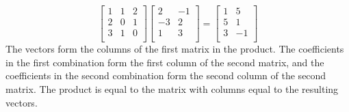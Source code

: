 \documentclass{article}
\begin{document}
\begin{examples}
\[\begin{bmatrix}
      1 & 1 & 2\\
      2 & 0 & 1\\
      3 & 1 & 0\\
    \end{bmatrix}
    \begin{bmatrix}
      2 & -1\\
      -3 & 2\\
      1 & 3\\
    \end{bmatrix}
    =
    \begin{bmatrix}
      1 & 5\\
      5 & 1\\
      3 & -1\\
    \end{bmatrix}
  \]
  The vectors form the columns of the first matrix in the product. The coefficients in the first combination form the first column of the second matrix, and the coefficients in the second combination form the second column of the second matrix. The product is equal to the matrix with columns equal to the resulting vectors.


\end{examples}
\end{document}
